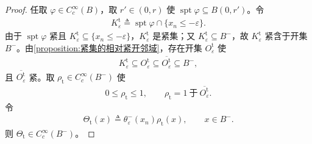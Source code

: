\documentclass[../../main.tex]{subfiles}
\begin{document}
\begin{proof}
任取 $\varphi\in C_{c}^{\infty}(B)$，取 $r'\in(0,r)$ 使 $\operatorname{spt}\varphi\subseteq B(0,r')$。令
\begin{align*}
K_{\varepsilon}^{\mathrm{t}}\triangleq\operatorname{spt}\varphi\cap\{x_n\leqslant-\varepsilon\}.
\end{align*}
由于 $\operatorname{spt}\varphi$ 紧且 $K_{\varepsilon}^{\mathrm{t}}\subseteq\{x_n\leqslant-\varepsilon\}$，$K_{\varepsilon}^{\mathrm{t}}$ 是紧集；又 $K_{\varepsilon}^{\mathrm{t}}\subseteq B^{-}$，故 $K_{\varepsilon}^{\mathrm{t}}$ 紧含于开集 $B^{-}$。由\cref{proposition:紧集的相对紧开邻域}，存在开集 $O_{\varepsilon}^{\mathrm{t}}$ 使
\begin{align*}
K_{\varepsilon}^{\mathrm{t}}\subseteq O_{\varepsilon}^{\mathrm{t}}\subseteq\overline{O_{\varepsilon}^{\mathrm{t}}}\subseteq B^{-},
\end{align*}
且 $\overline{O_{\varepsilon}^{\mathrm{t}}}$ 紧。取 $\rho_{\mathrm{t}}\in C_{c}^{\infty}(B^{-})$ 使
\begin{align}
0\leqslant\rho_{\mathrm{t}}\leqslant1,\qquad \rho_{\mathrm{t}}=1\ \text{于}\ \overline{O_{\varepsilon}^{\mathrm{t}}}.
\label{eq:ch05-片状负切向rho}
\end{align}
令
\begin{align}
\Theta_{\mathrm{t}}(x)\triangleq\theta_{\varepsilon}^{-}(x_n)\rho_{\mathrm{t}}(x),\qquad x\in B^{-}.
\label{eq:ch05-片状负切向Theta}
\end{align}
则 $\Theta_{\mathrm{t}}\in C_{c}^{\infty}(B^{-})$。


\end{proof}
\end{document}

